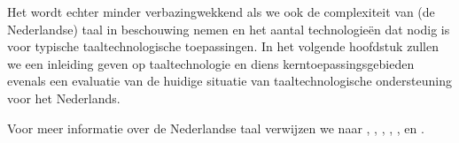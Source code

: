 \documentclass[]{../../metanetpaper}
\begin{document}
\begin{multicols}{2}

    Het wordt echter minder verbazingwekkend als we ook de complexiteit van (de Nederlandse) taal in beschouwing nemen en het aantal technologie{\"e}n dat nodig is voor typische taaltechnologische toepassingen. In het volgende hoofdstuk zullen we een inleiding geven op taaltechnologie en diens kerntoepassingsgebieden evenals een evaluatie van de huidige situatie van taaltechnologische ondersteuning voor het Nederlands.

    Voor meer informatie over de Nederlandse taal verwijzen we naar \cite{e-ans}, \cite{TUFenW}, \cite{NedWiki:Fries}, \cite{NedWiki:Nederlands}, \cite{NedWiki:Nedersaksisch},  \cite{Ethn-Dutch} en \cite{Ethn-LN}.

\nocite{Soria:Mariani:2011} \nocite{Joscelyne:Lockwood:2003}


\end{multicols}

\clearpage


\end{document}
